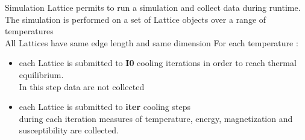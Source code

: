 Simulation Lattice permits to run a simulation and collect data during runtime.
The simulation is performed on a set of Lattice objects over a range of temperatures \\
All Lattices have same edge length and same dimension
For each temperature :  
\begin{itemize}
	\item[] each Lattice is submitted to \textbf{I0} cooling iterations in order to reach thermal equilibrium. \\ In this step data are not collected
	\item[] each Lattice is submitted to \textbf{iter} cooling steps   \\
	 		during each iteration measures of temperature, energy, magnetization and susceptibility are 				collected. 
\end{itemize} 
 
